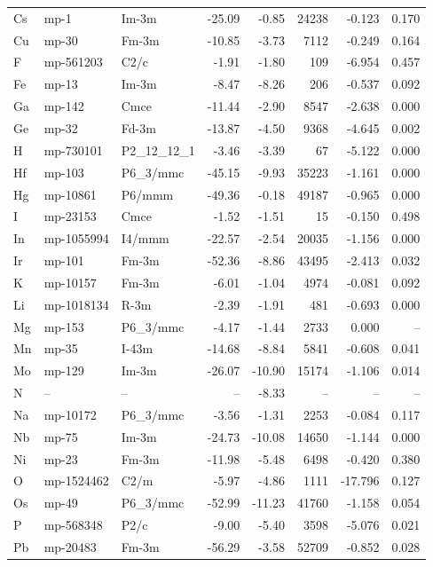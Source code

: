 \begin{longtable}{@{}ll l@{\hspace{4pt}} rrrrr@{}}
Cs & mp-1 & Im-3m & -25.09 & -0.85 & 24238 & -0.123 & 0.170 \\
Cu & mp-30 & Fm-3m & -10.85 & -3.73 & 7112 & -0.249 & 0.164 \\
F & mp-561203 & C2/c & -1.91 & -1.80 & 109 & -6.954 & 0.457 \\
Fe & mp-13 & Im-3m & -8.47 & -8.26 & 206 & -0.537 & 0.092 \\
Ga & mp-142 & Cmce & -11.44 & -2.90 & 8547 & -2.638 & 0.000 \\
Ge & mp-32 & Fd-3m & -13.87 & -4.50 & 9368 & -4.645 & 0.002 \\
H & mp-730101 & P2_12_12_1 & -3.46 & -3.39 & 67 & -5.122 & 0.000 \\
Hf & mp-103 & P6_3/mmc & -45.15 & -9.93 & 35223 & -1.161 & 0.000 \\
Hg & mp-10861 & P6/mmm & -49.36 & -0.18 & 49187 & -0.965 & 0.000 \\
I & mp-23153 & Cmce & -1.52 & -1.51 & 15 & -0.150 & 0.498 \\
In & mp-1055994 & I4/mmm & -22.57 & -2.54 & 20035 & -1.156 & 0.000 \\
Ir & mp-101 & Fm-3m & -52.36 & -8.86 & 43495 & -2.413 & 0.032 \\
K & mp-10157 & Fm-3m & -6.01 & -1.04 & 4974 & -0.081 & 0.092 \\
Li & mp-1018134 & R-3m & -2.39 & -1.91 & 481 & -0.693 & 0.000 \\
Mg & mp-153 & P6_3/mmc & -4.17 & -1.44 & 2733 & 0.000 & -- \\
Mn & mp-35 & I-43m & -14.68 & -8.84 & 5841 & -0.608 & 0.041 \\
Mo & mp-129 & Im-3m & -26.07 & -10.90 & 15174 & -1.106 & 0.014 \\
N & -- & -- & -- & -8.33 & -- & -- & -- \\
Na & mp-10172 & P6_3/mmc & -3.56 & -1.31 & 2253 & -0.084 & 0.117 \\
Nb & mp-75 & Im-3m & -24.73 & -10.08 & 14650 & -1.144 & 0.000 \\
Ni & mp-23 & Fm-3m & -11.98 & -5.48 & 6498 & -0.420 & 0.380 \\
O & mp-1524462 & C2/m & -5.97 & -4.86 & 1111 & -17.796 & 0.127 \\
Os & mp-49 & P6_3/mmc & -52.99 & -11.23 & 41760 & -1.158 & 0.054 \\
P & mp-568348 & P2/c & -9.00 & -5.40 & 3598 & -5.076 & 0.021 \\
Pb & mp-20483 & Fm-3m & -56.29 & -3.58 & 52709 & -0.852 & 0.028 \\

\end{longtable}

